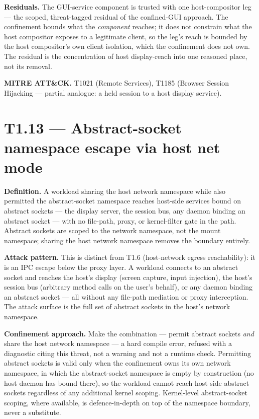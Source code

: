 \textbf{Residuals.} The GUI-service component is trusted with one
host-compositor leg --- the scoped, threat-tagged residual of the
confined-GUI approach. The confinement bounds what the \emph{component}
reaches; it does not constrain what the host compositor exposes to a
legitimate client, so the leg's reach is bounded by the host
compositor's own client isolation, which the confinement does not own.
The residual is the concentration of host display-reach into one
reasoned place, not its removal.

\textbf{MITRE ATT\&CK.} T1021 (Remote Services), T1185 (Browser Session
Hijacking --- partial analogue: a held session to a host display
service).

\hypertarget{t1.13-abstract-socket-namespace-escape-via-host-net-mode}{%
\section{T1.13 --- Abstract-socket namespace escape via host net
mode}\label{t1.13-abstract-socket-namespace-escape-via-host-net-mode}}

\textbf{Definition.} A workload sharing the host network namespace while
also permitted the abstract-socket namespace reaches host-side services
bound on abstract sockets --- the display server, the session bus, any
daemon binding an abstract socket --- with no file-path, proxy, or
kernel-filter gate in the path. Abstract sockets are scoped to the
network namespace, not the mount namespace; sharing the host network
namespace removes the boundary entirely.

\textbf{Attack pattern.} This is distinct from T1.6 (host-network egress
reachability): it is an IPC escape below the proxy layer. A workload
connects to an abstract socket and reaches the host's display (screen
capture, input injection), the host's session bus (arbitrary method
calls on the user's behalf), or any daemon binding an abstract socket
--- all without any file-path mediation or proxy interception. The
attack surface is the full set of abstract sockets in the host's network
namespace.

\textbf{Confinement approach.} Make the combination --- permit abstract
sockets \emph{and} share the host network namespace --- a hard compile
error, refused with a diagnostic citing this threat, not a warning and
not a runtime check. Permitting abstract sockets is valid only when the
confinement owns its own network namespace, in which the abstract-socket
namespace is empty by construction (no host daemon has bound there), so
the workload cannot reach host-side abstract sockets regardless of any
additional kernel scoping. Kernel-level abstract-socket scoping, where
available, is defence-in-depth on top of the namespace boundary, never a
substitute.

